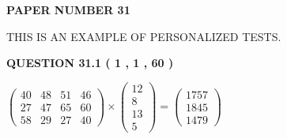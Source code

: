 \documentclass[12pt]{article}
\begin{document}
   
\newpage 
\setcounter{page}{ 
    31001 } 
   
   
   
   
 {\textbf{ \Large{ PAPER NUMBER  31  }}}
   
   
\vspace{0.2in}
   
   
   
   
   
   
 \vspace{0.2in}
{\Huge  THIS IS AN EXAMPLE OF}
{\Huge  PERSONALIZED TESTS. }
   
   
  
\vspace{0.2in}
  
{\textbf{\Large{QUESTION
31.1 
 ( 1 , 1 , 60 )
}}}
  
  
 
 
\noindent{}

 
$\left( \begin{array}{ccccccccccccccc}
 40  & 
 48  & 
 51  & 
 46  \\ 
 27  & 
 47  & 
 65  & 
 60  \\ 
 58  & 
 29  & 
 27  & 
 40
\end{array}\right) \times
\left( \begin{array}{c}
 12  \\ 
 8  \\ 
 13  \\ 
 5
\end{array}\right)  =
\left( \begin{array}{c}
 1757  \\ 
 1845  \\ 
 1479
\end{array}\right)  $
 
\end{document}
